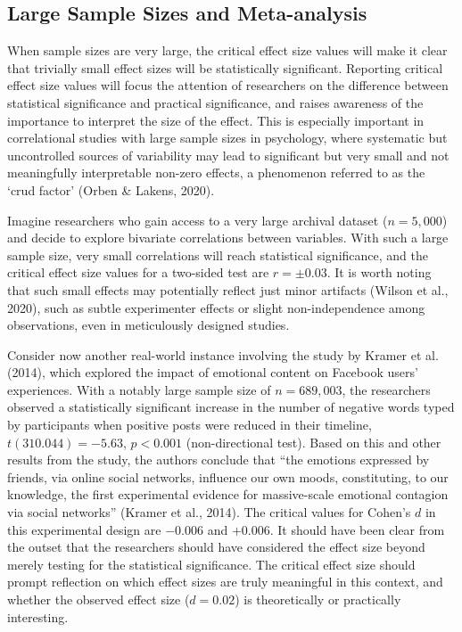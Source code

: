 \documentclass[
  man,floatsintext]{apa7}
\begin{document}
\hypertarget{large-sample-sizes-and-meta-analysis}{%
\subsection{Large Sample Sizes and Meta-analysis}\label{large-sample-sizes-and-meta-analysis}}

When sample sizes are very large, the critical effect size values will make it clear that trivially small effect sizes will be statistically significant. Reporting critical effect size values will focus the attention of researchers on the difference between statistical significance and practical significance, and raises awareness of the importance to interpret the size of the effect. This is especially important in correlational studies with large sample sizes in psychology, where systematic but uncontrolled sources of variability may lead to significant but very small and not meaningfully interpretable non-zero effects, a phenomenon referred to as the `crud factor' (Orben \& Lakens, 2020).

Imagine researchers who gain access to a very large archival dataset (\(n = 5,000\)) and decide to explore bivariate correlations between variables. With such a large sample size, very small correlations will reach statistical significance, and the critical effect size values for a two-sided test are \(r = \pm 0.03\). It is worth noting that such small effects may potentially reflect just minor artifacts (Wilson et al., 2020), such as subtle experimenter effects or slight non-independence among observations, even in meticulously designed studies.

Consider now another real-world instance involving the study by Kramer et al. (2014), which explored the impact of emotional content on Facebook users' experiences. With a notably large sample size of \(n = 689,003\), the researchers observed a statistically significant increase in the number of negative words typed by participants when positive posts were reduced in their timeline, \(t(310.044) = −5.63\), \(p < 0.001\) (non-directional test). Based on this and other results from the study, the authors conclude that ``the emotions expressed by friends, via online social networks, influence our own moods, constituting, to our knowledge, the first experimental evidence for massive-scale emotional contagion via social networks'' (Kramer et al., 2014). The critical values for Cohen's \(d\) in this experimental design are \(-0.006\) and \(+0.006\). It should have been clear from the outset that the researchers should have considered the effect size beyond merely testing for the statistical significance. The critical effect size should prompt reflection on which effect sizes are truly meaningful in this context, and whether the observed effect size (\(d = 0.02\)) is theoretically or practically interesting.
\end{document}
